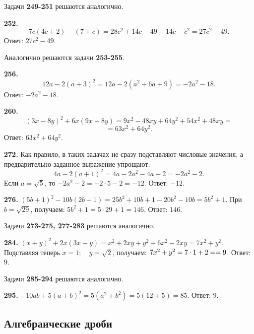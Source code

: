 Задачи \textbf{249-251} решаются аналогично.

\textbf{252.} $$7c\left(4c+2\right)-\left(7+c\right)=28c^2+14c-49-14c-c^2=27c^2-49.$$ \newline \null \hspace*{\fill}Ответ: $27c^2-49$.

Аналогично решаются задачи \textbf{253-255}.

\textbf{256.} $$12a-2\left(a+3\right)^2=12a-2\left(a^2+6a+9\right)=-2a^2-18.$$
\newline \null \hspace*{\fill} Ответ: $-2a^2-18$. 

\textbf{260.} $$\left(3x-8y\right)^2+6x\left(9x+8y\right)=9x^2-48xy+64y^2+54x^2+48xy=$$ $$=63x^2+64y^2.$$ \newline \null \hspace*{\fill} Ответ: $63x^2+64y^2$. 

\textbf{272.}  Как правило, в таких задачах не сразу подставляют числовые значения, а предварительно заданное выражение упрощают: $$4a-2\left(a+1\right)^2=4a-2a^2-4a-2=-2a^2-2.$$ Если $a=\sqrt{5}$, то $-2a^2-2=-2\cdot5-2=-12.$ \newline \null \hspace*{\fill} Ответ: $-12$. 

\textbf{276.} $\left(5b+1\right)^2-10b\left(2b+1\right)=25b^2+10b+1-20b^2-10b=5b^2+1.$ При $b=\sqrt{29}$, получаем: $5b^2+1=5\cdot29+1=146$. \newline \null \hspace*{\fill} Ответ: $146$.

Задачи \textbf{273-275, 277-283} решаются аналогично. 

\textbf{284.} $\left(x+y\right)^2+2x(3x-y)=x^2+2xy+y^2+6x^2-2xy=7x^2+y^2$. Подставляя теперь $x=1;\quad y=\sqrt{2}$, получаем: $7x^2+y^2=7\cdot1+2=\linebreak=9$. \newline \null \hspace*{\fill} Ответ: $9$. 

Задачи  \textbf{285-294}  решаются аналогично. 

\textbf{295.} $-10ab+5\left(a+b\right)^2=5\left(a^2+b^2\right)=5\left(12+5\right)=85$.  \null \hspace*{\fill} Ответ: $9$. 

\newpage \subsection{Алгебраические дроби}


